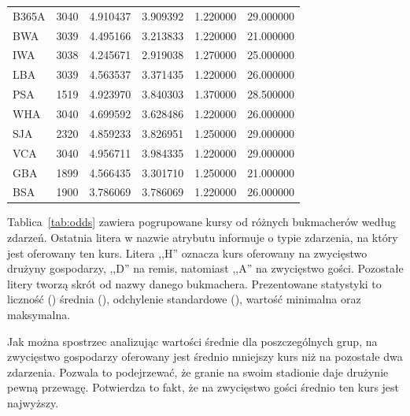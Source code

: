 \begin{table}[H]
\begin{tabular}{l c c c c c}
        B365A & 3040 & 4.910437 & 3.909392 & 1.220000 & 29.000000\\
        BWA & 3039 & 4.495166 & 3.213833 & 1.220000 & 21.000000\\
        IWA & 3038 & 4.245671 & 2.919038 & 1.270000 & 25.000000\\
        LBA & 3039 & 4.563537 & 3.371435 & 1.220000 & 26.000000\\
        PSA & 1519 & 4.923970 & 3.840303 & 1.370000 & 28.500000\\
        WHA & 3040 & 4.699592 & 3.628486 & 1.220000 & 26.000000\\
        SJA & 2320 & 4.859233 & 3.826951 & 1.250000 & 29.000000\\
        VCA & 3040 & 4.956711 & 3.984335 & 1.220000 & 29.000000\\
        GBA & 1899 & 4.566435 & 3.301710 & 1.250000 & 21.000000\\
        BSA & 1900 & 3.786069 & 3.786069 & 1.220000 & 26.000000\\
    \bottomrule
    \end{tabular}
    \end{table}
    
    \noindent Tablica~\ref{tab:odds} zawiera pogrupowane kursy od różnych bukmacherów według zdarzeń. Ostatnia litera w nazwie atrybutu informuje o typie zdarzenia, na który jest oferowany ten kurs. Litera ,,H'' oznacza kurs oferowany na zwycięstwo drużyny gospodarzy, ,,D'' na remis, natomiast ,,A'' na zwycięstwo gości. Pozostałe litery tworzą skrót od nazwy danego bukmachera. Prezentowane statystyki to liczność () średnia (), odchylenie standardowe (), wartość minimalna oraz maksymalna.
    
    Jak można spostrzec analizując wartości średnie dla poszczególnych grup, na zwycięstwo gospodarzy oferowany jest średnio mniejszy kurs niż na pozostałe dwa zdarzenia. Pozwala to podejrzewać, że granie na swoim stadionie daje drużynie pewną przewagę. Potwierdza to fakt, że na zwycięstwo gości średnio ten kurs jest najwyższy.
    
